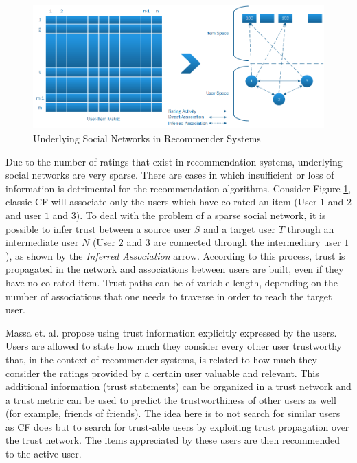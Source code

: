 \begin{figure}[H]
    \includegraphics[width=5in]{image/trustnetwork.png}
    \centering
    \caption[Underlying Social Networks in Recommender Systems]{Underlying Social Networks in Recommender Systems}
    \label{figure:cfsocialnetwork}
\end{figure}

Due to the number of ratings that exist in recommendation systems, underlying social networks are very sparse. There are cases in which insufficient or loss of information is detrimental for the recommendation algorithms. Consider Figure \ref{figure:cfsocialnetwork}, classic CF will associate only the users which have co-rated an item (User $1$ and $2$ and user $1$ and $3$). To deal with the problem of a sparse social network, it is possible to infer trust between a source user $S$ and a target user $T$ through an intermediate user $N$ (User $2$ and $3$ are connected through the intermediary user $1$), as shown by the \emph{Inferred Association} arrow. According to this process, trust is propagated in the network and associations between users are built, even if they have no co-rated item. Trust paths can be of variable length, depending on the number of associations that one needs to traverse in order to reach the target user.






Massa et. al. \cite{Massa2007} propose using trust information explicitly expressed by the users. Users are allowed to state how much they consider every other user trustworthy that, in the context of recommender systems, is related to how much they consider the ratings provided by a certain user valuable and relevant. This additional information (trust statements) can be organized in a trust network and a trust metric can be used to predict the trustworthiness of other users as well (for example, friends of friends). The idea here is to not search for similar users as CF does but to search for trust-able users by exploiting trust propagation over the trust network. The items appreciated by these users are then recommended to the active user.

